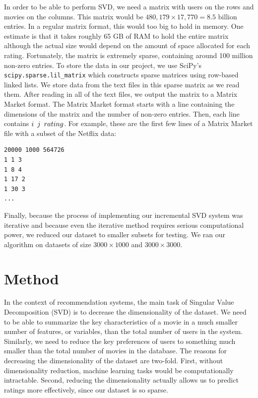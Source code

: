 \documentclass{article} %
\begin{document}
In order to be able to perform SVD, we need a matrix with users on the rows and movies on the columns.
This matrix would be $480,179 \times 17,770 = 8.5 \textrm{ billion}$ entries.
In a regular matrix format, this would too big to hold in memory.
One estimate is that it takes roughly 65 GB of RAM to hold the entire matrix \citep{revoR} although the actual size would depend on the amount of space allocated for each rating.
Fortunately, the matrix is extremely sparse, containing around 100 million non-zero entries.
To store the data in our project, we use SciPy's \verb!scipy.sparse.lil_matrix! which constructs sparse matrices using row-based linked lists.
We store data from the text files in this sparse matrix as we read them.
After reading in all of the text files, we output the matrix to a Matrix Market format.
The Matrix Market format starts with a line containing the dimensions of the matrix and the number of non-zero entries.
Then, each line contains $i \enskip j \enskip rating$.
For example, these are the first few lines of a Matrix Market file with a subset of the Netflix data:

\begin{verbatim}
20000 1000 564726
1 1 3
1 8 4
1 17 2
1 30 3
...
\end{verbatim}

Finally, because the process of implementing our incremental SVD system was iterative and because even the iterative method requires serious computational power, we reduced our dataset to smaller subsets for testing.
We ran our algorithm on datasets of size $3000 \times 1000$ and $3000 \times 3000$.

\section{Method}

In the context of recommendation systems, the main task of Singular Value Decomposition (SVD) is to decrease the dimensionality of the dataset.
We need to be able to summarize the key characteristics of a movie in a much smaller number of features, or variables, than the total number of users in the system.
Similarly, we need to reduce the key preferences of users to something much smaller than the total number of movies in the database.
The reasons for decreasing the dimensionality of the dataset are two-fold.
First, without dimensionality reduction, machine learning tasks would be computationally intractable.
Second, reducing the dimensionality actually allows us to predict ratings more effectively, since our dataset is so sparse.
\end{document}
